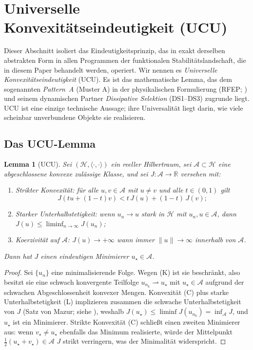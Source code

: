\documentclass[11pt]{article}
\newtheorem{lemma}[theorem]{Lemma}
\theoremstyle{definition}
\theoremstyle{remark}
\begin{document}
\section{Universelle Konvexitätseindeutigkeit (UCU)}
\label{sec:ucu}

Dieser Abschnitt isoliert das Eindeutigkeitsprinzip, das in exakt
derselben abstrakten Form in allen Programmen der funktionalen Stabilitätslandschaft,
die in diesem Paper behandelt werden, operiert. Wir nennen es
\emph{Universelle Konvexitätseindeutigkeit} (UCU). Es ist das
mathematische Lemma, das dem sogenannten \emph{Pattern~A} (Muster A) in
der physikalischen Formulierung (RFEP; \cite{RFEPFramework}) und seinem
dynamischen Partner \emph{Dissipative Selektion} (DS1--DS3) zugrunde liegt.
UCU ist eine einzige technische Aussage; ihre Universalität liegt darin,
wie viele scheinbar unverbundene Objekte sie realisieren.

\subsection{Das UCU-Lemma}
\label{sec:ucu-lemma}

\begin{lemma}[UCU]\label{lem:ucu}
Sei $(\mathcal{H}, \langle\cdot,\cdot\rangle)$ ein reeller Hilbertraum,
sei $\mathcal{A} \subset \mathcal{H}$ eine abgeschlossene konvexe zulässige Klasse,
und sei $J : \mathcal{A} \to \mathbb{R}$ versehen mit:
\begin{enumerate}
\item[(C)] \emph{Strikter Konvexität:} für alle $u,v \in \mathcal{A}$
mit $u \neq v$ und alle $t \in (0,1)$ gilt
\[
  J(tu + (1-t)v) < t\,J(u) + (1-t)\,J(v);
\]
\item[(L)] \emph{Starker Unterhalbstetigkeit:} wenn $u_n \to u$
stark in $\mathcal{H}$ mit $u_n, u \in \mathcal{A}$, dann
$J(u) \leq \liminf_{n\to\infty} J(u_n)$;
\item[(K)] \emph{Koerzivität auf $\mathcal{A}$:} $J(u) \to +\infty$
wann immer $\|u\| \to \infty$ innerhalb von $\mathcal{A}$.
\end{enumerate}
Dann hat $J$ einen eindeutigen Minimierer $u_\star \in \mathcal{A}$.
\end{lemma}

\begin{proof}
Sei $\{u_n\}$ eine minimalisierende Folge. Wegen (K) ist sie beschränkt, also
besitzt sie eine schwach konvergente Teilfolge $u_{n_k} \rightharpoonup u_\star$
mit $u_\star \in \mathcal{A}$ aufgrund der schwachen Abgeschlossenheit konvexer
Mengen. Konvexität (C) plus starke Unterhalbstetigkeit (L) implizieren zusammen
die schwache Unterhalbstetigkeit von $J$ (Satz von Mazur; siehe
\cite[Prop.~II.1.2]{EkelandTemam1999}), weshalb
$J(u_\star) \leq \liminf J(u_{n_k}) = \inf_{\mathcal{A}} J$, und
$u_\star$ ist ein Minimierer. Strikte Konvexität (C) schließt einen zweiten
Minimierer aus: wenn $v_\star \neq u_\star$ ebenfalls das Minimum realisierte,
würde der Mittelpunkt $\tfrac{1}{2}(u_\star + v_\star) \in \mathcal{A}$
$J$ strikt verringern, was der Minimalität widerspricht.
\end{proof}
\end{document}
